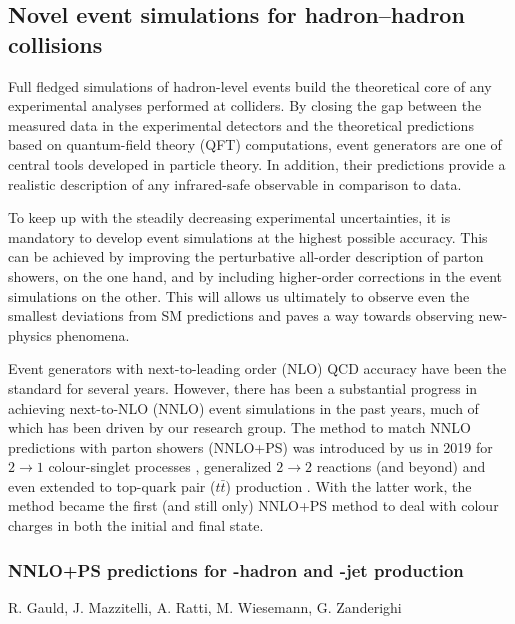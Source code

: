 \documentclass{FBR_Bericht_2025}
\begin{document}
\subsection{Novel event simulations for hadron--hadron collisions}
\begin{refsection}
Full fledged simulations of hadron-level events build the theoretical 
core of any experimental analyses performed at colliders.
By closing the gap between the measured data in the experimental
detectors and the theoretical predictions based on quantum-field theory
(QFT) computations, event generators are one of central tools developed
in particle theory. In addition, their predictions provide a realistic description
of any infrared-safe observable in comparison to data.

To keep up with the steadily decreasing experimental uncertainties, it is 
mandatory to develop event simulations at the highest possible accuracy.
This can be achieved by improving the perturbative all-order description 
of parton showers, on the one hand, and by including higher-order corrections
in the event simulations on the other. This will allows us ultimately to observe even the smallest
deviations from SM predictions and paves a way towards observing new-physics phenomena.

Event generators with next-to-leading order (NLO) QCD accuracy have been the standard for several years. 
However, there has been a substantial progress in achieving next-to-NLO
(NNLO) event simulations in the past years, much of which has been driven by our research
group. The \minnlo{} method to match NNLO predictions with parton showers (NNLO+PS)
was introduced by us in 2019 for $2\to 1$ colour-singlet 
processes \cite{Monni:2019whf,Monni:2020nks}, generalized $2\to 2$ reactions 
(and beyond) \cite{Lombardi:2020wju} and even extended to top-quark pair ($t\bar t$) production \cite{Mazzitelli:2020jio,Mazzitelli:2021mmm}. 
With the latter work, the \minnlo{} method became the first 
(and still only) NNLO+PS method to deal with colour charges in both the initial and final state.
%
\subsubsection[NNLO+PS predictions for $B$-hadron and $b$-jet production]{NNLO+PS predictions for -hadron and -jet production}

\begin{Namen}
R. Gauld, J. Mazzitelli, A. Ratti, M. Wiesemann, G. Zanderighi
\end{Namen}


\end{refsection}
\end{document}
